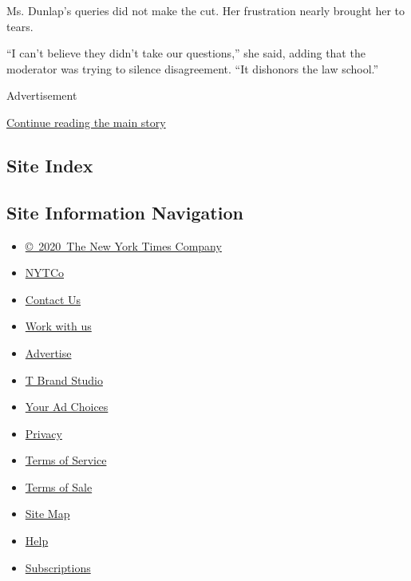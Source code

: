 Ms. Dunlap's queries did not make the cut. Her frustration nearly
brought her to tears.

``I can't believe they didn't take our questions,'' she said, adding
that the moderator was trying to silence disagreement. ``It dishonors
the law school.''

Advertisement

\protect\hyperlink{after-bottom}{Continue reading the main story}

\hypertarget{site-index}{%
\subsection{Site Index}\label{site-index}}

\hypertarget{site-information-navigation}{%
\subsection{Site Information
Navigation}\label{site-information-navigation}}

\begin{itemize}
\tightlist
\item
  \href{https://help.nytimes3xbfgragh.onion/hc/en-us/articles/115014792127-Copyright-notice}{©~2020~The
  New York Times Company}
\end{itemize}

\begin{itemize}
\tightlist
\item
  \href{https://www.nytco.com/}{NYTCo}
\item
  \href{https://help.nytimes3xbfgragh.onion/hc/en-us/articles/115015385887-Contact-Us}{Contact
  Us}
\item
  \href{https://www.nytco.com/careers/}{Work with us}
\item
  \href{https://nytmediakit.com/}{Advertise}
\item
  \href{http://www.tbrandstudio.com/}{T Brand Studio}
\item
  \href{https://www.nytimes3xbfgragh.onion/privacy/cookie-policy\#how-do-i-manage-trackers}{Your
  Ad Choices}
\item
  \href{https://www.nytimes3xbfgragh.onion/privacy}{Privacy}
\item
  \href{https://help.nytimes3xbfgragh.onion/hc/en-us/articles/115014893428-Terms-of-service}{Terms
  of Service}
\item
  \href{https://help.nytimes3xbfgragh.onion/hc/en-us/articles/115014893968-Terms-of-sale}{Terms
  of Sale}
\item
  \href{https://spiderbites.nytimes3xbfgragh.onion}{Site Map}
\item
  \href{https://help.nytimes3xbfgragh.onion/hc/en-us}{Help}
\item
  \href{https://www.nytimes3xbfgragh.onion/subscription?campaignId=37WXW}{Subscriptions}
\end{itemize}
